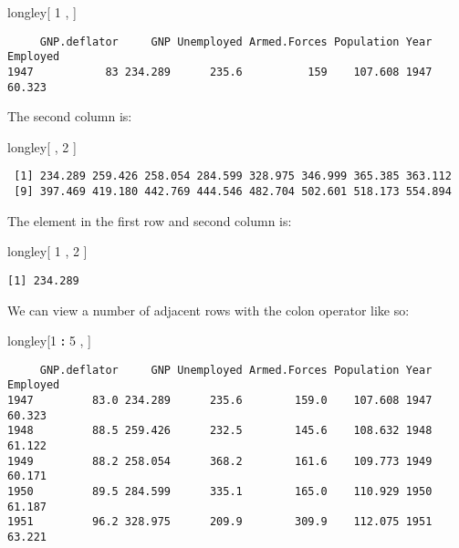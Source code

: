 \documentclass[]{article}
\newenvironment{Shaded}{\begin{snugshade}}{\end{snugshade}}
\newcommand{\DecValTok}[1]{\textcolor[rgb]{0.00,0.00,0.81}{#1}}
\newcommand{\NormalTok}[1]{#1}
\newcommand{\OperatorTok}[1]{\textcolor[rgb]{0.81,0.36,0.00}{\textbf{#1}}}
\newcommand{\StringTok}[1]{\textcolor[rgb]{0.31,0.60,0.02}{#1}}
\begin{document}
\begin{Shaded}
\begin{Highlighting}[]
\NormalTok{longley[ }\DecValTok{1}\NormalTok{ , ]}
\end{Highlighting}
\end{Shaded}

\begin{verbatim}
     GNP.deflator     GNP Unemployed Armed.Forces Population Year Employed
1947           83 234.289      235.6          159    107.608 1947   60.323
\end{verbatim}

The second column is:

\begin{Shaded}
\begin{Highlighting}[]
\NormalTok{longley[ , }\DecValTok{2}\NormalTok{ ]}
\end{Highlighting}
\end{Shaded}

\begin{verbatim}
 [1] 234.289 259.426 258.054 284.599 328.975 346.999 365.385 363.112
 [9] 397.469 419.180 442.769 444.546 482.704 502.601 518.173 554.894
\end{verbatim}

The element in the first row and second column is:

\begin{Shaded}
\begin{Highlighting}[]
\NormalTok{longley[ }\DecValTok{1}\NormalTok{ , }\DecValTok{2}\NormalTok{ ]}
\end{Highlighting}
\end{Shaded}

\begin{verbatim}
[1] 234.289
\end{verbatim}

We can view a number of adjacent rows with the colon operator like so:

\begin{Shaded}
\begin{Highlighting}[]
\NormalTok{longley[}\DecValTok{1} \OperatorTok{:}\StringTok{ }\DecValTok{5}\NormalTok{ , ]}
\end{Highlighting}
\end{Shaded}

\begin{verbatim}
     GNP.deflator     GNP Unemployed Armed.Forces Population Year Employed
1947         83.0 234.289      235.6        159.0    107.608 1947   60.323
1948         88.5 259.426      232.5        145.6    108.632 1948   61.122
1949         88.2 258.054      368.2        161.6    109.773 1949   60.171
1950         89.5 284.599      335.1        165.0    110.929 1950   61.187
1951         96.2 328.975      209.9        309.9    112.075 1951   63.221
\end{verbatim}
\end{document}
